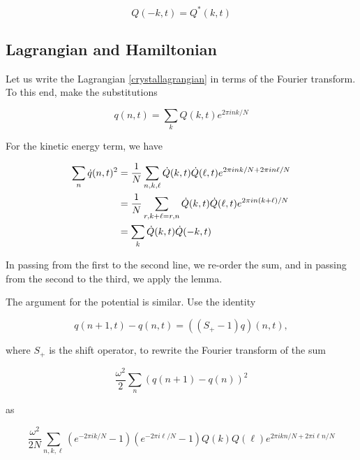 \begin{equation}
Q(-k,t) = Q^*(k,t)
\end{equation}


 \subsection{Lagrangian  and  Hamiltonian}

Let us write  the  Lagrangian   \eqref{crystallagrangian} in  terms  of  the  Fourier  transform.   To  this  end,  make  the  substitutions



\begin{equation}
q(n,t) = \sum_k Q(k,t) e^{2\pi i nk/N}
\end{equation}


For  the  kinetic  energy  term,
 we  have



\begin{align}
\sum_n \dot q(n,t)^2 &=
\small{\frac{1}{N}} \sum_{n,k , \ell} \dot Q(k,t) \dot Q(\ell,t) 
e^{2\pi i nk/N + 2\pi i n\ell/N} \\
&= \small{\frac{1}{N}} \sum_{r , k+\ell = r,n} \dot Q(k,t) \dot Q(\ell,t) 
e^{2\pi i n(k + \ell)/N } \\   
&= \sum_{k} \dot Q(k,t) \dot Q(-k,t)
\end{align}


In  passing  from  the  first  to  the  second  line,  we  re-order  the  sum,  and  in  passing  from  the  second  to  the  third,  we  apply  the  lemma.



The  argument  for  the  potential  is  similar.   Use  the  identity



\begin{equation}
q(n+1,t) - q(n,t) = ((S_+ - 1)q)(n,t),
\end{equation}


where   $S_+$  is  the  shift  operator,  to  rewrite  the  Fourier  transform  of  the  sum



\begin{equation}
\frac{\omega^2}{2}\sum_n (q(n+1) - q(n))^2
\end{equation}


as



\begin{equation}
\frac{\omega^2}{2N} \sum_{n,k,\ell}
(e^{-2\pi i k/N} - 1)
(e^{-2\pi i \ell/N} - 1)
Q(k) Q(\ell)  e^{2\pi i k n/N + 2\pi i \ell n/N}
\end{equation}


